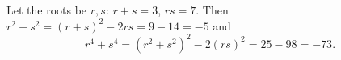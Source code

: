 Let the roots be \(r,s\): \(r+s=3\), \(rs=7\). Then \(r^2+s^2=(r+s)^2-2rs=9-14=-5\) and
\[
r^4+s^4=(r^2+s^2)^2-2(rs)^2=25-98=\boxed{-73}.
\]
